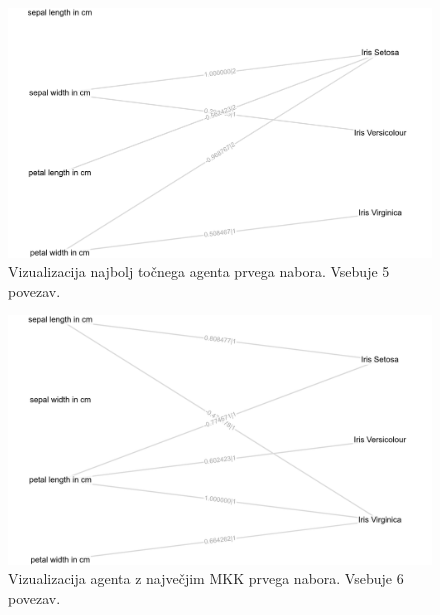 \begin{figure}[H]
    \begin{center}
        \includegraphics[width=13cm]{iris/1/acc_g}
    \end{center}
    \caption{Vizualizacija najbolj točnega agenta prvega nabora. Vsebuje 5 povezav.}
    \label{fig:iris_acc_1_g}
\end{figure}

\begin{figure}[H]
    \begin{center}
        \includegraphics[width=13cm]{iris/1/mcc_g}
    \end{center}
    \caption{Vizualizacija agenta z največjim MKK prvega nabora. Vsebuje 6 povezav.}
    \label{fig:iris_mcc_1_g}
\end{figure}

\newpage

